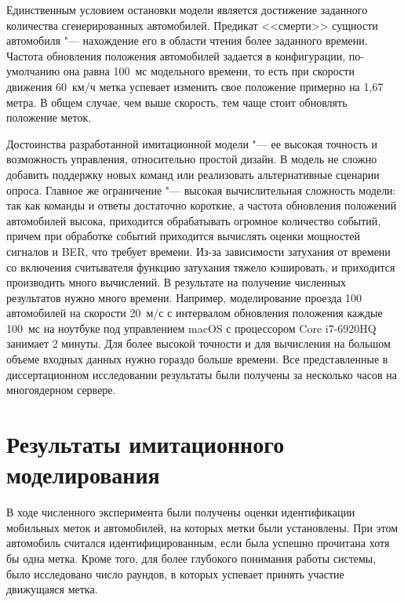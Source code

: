 Единственным условием остановки модели является достижение заданного количества сгенерированных автомобилей. Предикат <<смерти>> сущности автомобиля "--- нахождение его в области чтения более заданного времени. Частота обновления положения автомобилей задается в конфигурации, по-умолчанию она равна 100~мс модельного времени, то есть при скорости движения 60~км/ч метка успевает изменить свое положение примерно на 1,67 метра. В общем случае, чем выше скорость, тем чаще стоит обновлять положение меток.

Достоинства разработанной имитационной модели "--- ее высокая точность и возможность управления, относительно простой дизайн. В модель не сложно добавить поддержку новых команд или реализовать альтернативные сценарии опроса. Главное же ограничение "--- высокая вычислительная сложность модели: так как команды и ответы достаточно короткие, а частота обновления положений автомобилей высока, приходится обрабатывать огромное количество событий, причем при обработке событий приходится вычислять оценки мощностей сигналов и BER, что требует времени. Из-за зависимости затухания от времени со включения считывателя функцию затухания тяжело кэшировать, и приходится производить много вычислений. В результате на получение численных результатов нужно много времени. Например, моделирование проезда 100 автомобилей на скорости 20~м/с с интервалом обновления положения каждые 100~мс на ноутбуке под управлением macOS с процессором Core i7-6920HQ занимает 2 минуты. Для более высокой точности и для вычисления на большом объеме входных данных нужно гораздо больше времени. Все представленные в диссертационном исследовании результаты были получены за несколько часов на многоядерном сервере.






\section{Результаты имитационного моделирования}\label{sec:ch2_results}
В ходе численного эксперимента были получены оценки идентификации мобильных меток и автомобилей, на которых метки были установлены. При этом автомобиль считался идентифицированным, если была успешно прочитана хотя бы одна метка. Кроме того, для более глубокого понимания работы системы, было исследовано число раундов, в которых успевает принять участие движущаяся метка.



